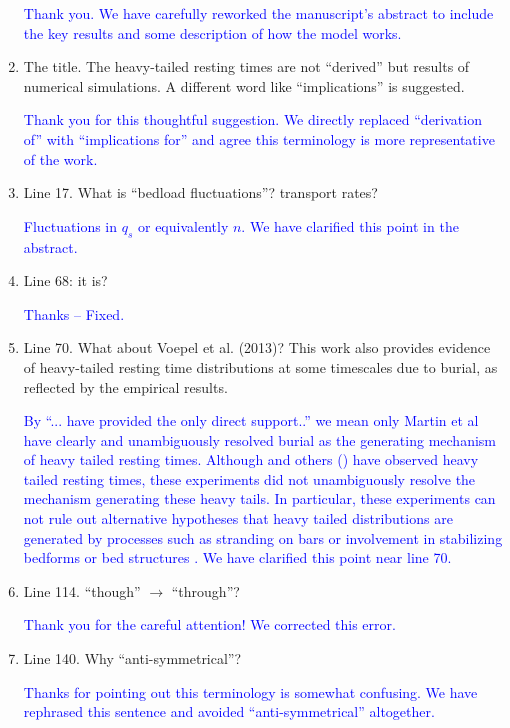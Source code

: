 \documentclass[11pt]{article}
\begin{document}
\begin{enumerate}
\textcolor{blue}{Thank you. We have carefully reworked the manuscript's abstract to include the key results and some description of how the model works.}


\item The title. The heavy-tailed resting times are not “derived” but results of numerical simulations. A different word like “implications” is suggested.

\textcolor{blue}{Thank you for this thoughtful suggestion. We directly replaced ``derivation of'' with ``implications for'' and agree this terminology is more representative of the work.}

\item Line 17. What is “bedload fluctuations”? transport rates?

\textcolor{blue}{Fluctuations in $q_s$ or equivalently $n$. We have clarified this point in the abstract.}

\item Line 68: it is?

\textcolor{blue}{Thanks -- Fixed.}


\item Line 70. What about Voepel et al. (2013)? This work also provides evidence of heavy-tailed resting time distributions at some timescales due to burial, as reflected by the empirical results.

\textcolor{blue}{By ``...\citet{Martin2014} have provided the only direct support..'' we mean only Martin et al have clearly and unambiguously resolved burial as the generating mechanism of heavy tailed resting times. Although \citet{Voepel2013} and others (\citep{Martin2014, Pretzlav2016, Olinde2015}) have observed heavy tailed resting times, these experiments did not unambiguously resolve the mechanism generating these heavy tails. In particular, these experiments can not rule out alternative hypotheses that heavy tailed distributions are generated by processes such as stranding on bars \citep[e.g.,][]{Bradley2017} or involvement in stabilizing bedforms or bed structures \citep[e.g.,][]{Church1998,Hassan2008}. We have clarified this point near line 70.}

\item Line 114. ``though'' $\rightarrow$ ``through''?

\textcolor{blue}{Thank you for the careful attention! We corrected this error.}

\item Line 140. Why “anti-symmetrical”?

\textcolor{blue}{Thanks for pointing out this terminology is somewhat confusing. We have rephrased this sentence and avoided ``anti-symmetrical'' altogether.}


\end{enumerate}
\end{document}
